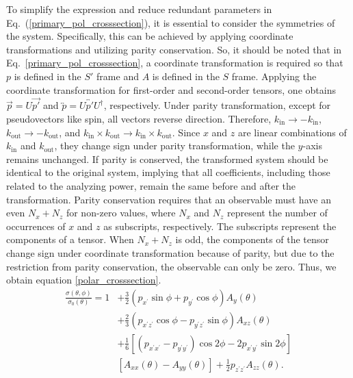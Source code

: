 \documentclass[twocolumn,twoside,showpacs,showkeys,preprintnumbers,superscriptaddress,amsmath,amssymb,prc,nofootinbib,a4paper]{revtex4}
\begin{document}
To simplify the expression and reduce redundant parameters in Eq.~(\ref{primary_pol_crosssection}), it is essential to consider the symmetries of the system. Specifically, this can be achieved by applying coordinate transformations and utilizing parity conservation. So, it should be noted that in Eq.~\ref{primary_pol_crosssection}, a coordinate transformation is required so that $p$ is defined in the $S'$ frame and $A$ is defined in the $S$ frame. Applying the coordinate transformation for first-order and second-order tensors, one obtains $\overrightarrow{p} = U \overrightarrow{p'}$ and $\overleftrightarrow{p} = U \overleftrightarrow{p'} U^\dagger$, respectively. Under parity transformation, except for pseudovectors like spin, all vectors reverse direction. Therefore, $k_{\text{in}} \rightarrow -k_{\text{in}}$, $k_{\text{out}} \rightarrow -k_{\text{out}}$, and $k_{\text{in}} \times k_{\text{out}} \rightarrow k_{\text{in}} \times k_{\text{out}}$. Since $x$ and $z$ are linear combinations of $k_{\text{in}}$ and $k_{\text{out}}$, they change sign under parity transformation, while the $y$-axis remains unchanged. If parity is conserved, the transformed system should be identical to the original system, implying that all coefficients, including those related to the analyzing power, remain the same before and after the transformation.
Parity conservation requires that an observable must have an even $N_x + N_z$ for non-zero values, where $N_x$ and $N_z$ represent the number of occurrences of $x$ and $z$ as subscripts, respectively. The subscripts represent the components of a tensor. When $N_x + N_z$ is odd, the components of the tensor change sign under coordinate transformation because of parity, but due to the restriction from parity conservation, the observable can only be zero. Thus, we obtain equation \ref{polar_crosssection}.
    \begin{align}\label{polar_crosssection}
    \frac{\sigma(\theta, \phi)}{\sigma_0(\theta)}=1 & +\frac{3}{2}\left(p_{x^{\prime}} \sin \phi+p_{y^{\prime}} \cos \phi\right) A_y(\theta) \nonumber \\
    &+\frac{2}{3}\left(p_{x^{\prime} z^{\prime}} \cos \phi-p_{y^{\prime} z^{\prime}} \sin \phi\right) A_{x z}(\theta)  \nonumber \\
    &+\frac{1}{6}\left[\left(p_{x^{\prime} x^{\prime}}-p_{y^{\prime} y^{\prime}}\right) \cos 2 \phi-2 p_{x^{\prime} y^{\prime}} \sin 2 \phi\right] \nonumber \\  &\left[A_{x x}(\theta)-A_{yy}(\theta)\right] +\frac{1}{2} p_{z^{\prime} z^{\prime}} A_{z z}(\theta) .
    \end{align}
\end{document}
